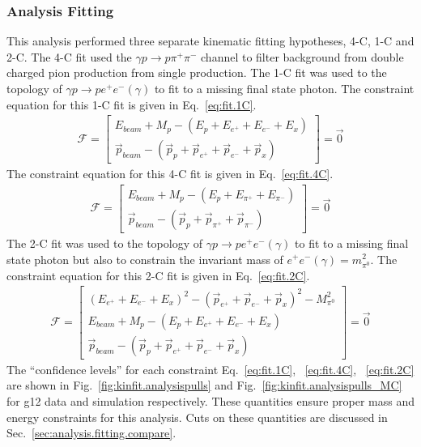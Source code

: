 \subsubsection{Analysis Fitting}\label{sec:analysis.fitting.topology}
This analysis performed three separate kinematic fitting hypotheses, 4-C, 1-C and 2-C. The 4-C fit used the $\gamma p \to p \pi^+ \pi^-$ channel to filter background from double charged pion production from single \pizT production. The 1-C fit was used to the topology of $\gamma p \rightarrow p e^+e^-(\gamma)$ to fit to a missing final state photon. The constraint equation for this 1-C fit is given in Eq.~\ref{eq:fit.1C}.
\begin{align}\label{eq:fit.1C}
\mathcal{F} =\left[\begin{array}{c}
E_{beam}+M_p-(E_p+E_{e^+} + E_{e^-} + E_{x}) \\[3pt]
\vec{p}_{beam} - (\vec{p}_{p} +\vec{p}_{e^+} + \vec{p}_{e^-} + \vec{p}_{x})
\end{array}\right]=\vec{0}
\end{align}
The constraint equation for this 4-C fit is given in Eq.~\ref{eq:fit.4C}.
\begin{align}\label{eq:fit.4C}
\mathcal{F} =\left[\begin{array}{c}
E_{beam}+M_p-(E_p+E_{\pi^+} + E_{\pi^-}) \\[3pt]
\vec{p}_{beam} - (\vec{p}_{p} +\vec{p}_{\pi^+} + \vec{p}_{\pi^-})
\end{array}\right]=\vec{0}
\end{align}
The 2-C fit was used to the topology of $\gamma p \rightarrow p e^+e^-(\gamma)$ to fit to a missing final state photon but also to constrain the invariant mass of $e^+e^-(\gamma) = m_{\pi^0}^2$. The constraint equation for this 2-C fit is given in Eq.~\ref{eq:fit.2C}.
\begin{align}\label{eq:fit.2C}
\mathcal{F} =\left[\begin{array}{c}
(E_{e^+} + E_{e^-} + E_{x})^2 - (\vec{p}_{e^+} + \vec{p}_{e^-} + \vec{p}_{x})^2 - M_{\pi^0}^2 \\[3pt]
E_{beam}+M_p-(E_p+E_{e^+} + E_{e^-} + E_{x}) \\[3pt]
\vec{p}_{beam} - (\vec{p}_{p} +\vec{p}_{e^+} + \vec{p}_{e^-} + \vec{p}_{x})
\end{array}\right]=\vec{0}
\end{align}
The ``confidence levels'' for each constraint Eq.~\ref{eq:fit.1C}, ~\ref{eq:fit.4C}, ~\ref{eq:fit.2C} are shown in Fig.~\ref{fig:kinfit.analysispulls} and Fig.~\ref{fig:kinfit.analysispulls_MC} for g12 data and simulation respectively. These quantities ensure proper mass and energy constraints for this analysis. Cuts on these quantities are discussed in Sec.~\ref{sec:analysis.fitting.compare}.
